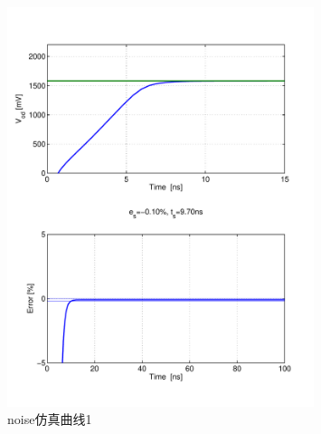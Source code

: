 \documentclass[a4paper]{article}
\begin{document}
\begin{figure}[htb]
    \begin{center}
        \includegraphics[width=0.8\textwidth]{fast/tran1.pdf}
    \end{center}
    \caption{noise仿真曲线1}
    \label{fasttran1}
\end{figure}
\end{document}
